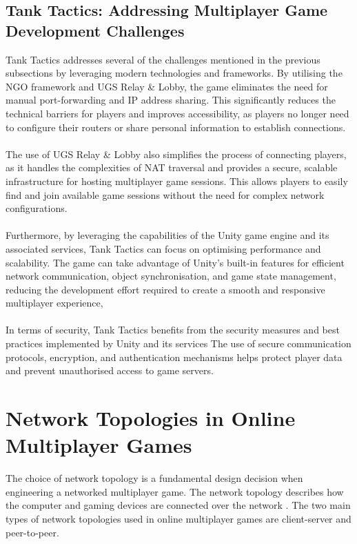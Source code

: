 \subsection{Tank Tactics: Addressing Multiplayer Game Development Challenges}
Tank Tactics addresses several of the challenges mentioned in the previous subsections by leveraging modern technologies and frameworks. By utilising the NGO framework and UGS Relay \& Lobby, the game eliminates the need for manual port-forwarding and IP address sharing. This significantly reduces the technical barriers for players and improves accessibility, as players no longer need to configure their routers or share personal information to establish connections.
\\
\noindent
\\
The use of UGS Relay \& Lobby also simplifies the process of connecting players, as it handles the complexities of NAT traversal and provides a secure, scalable infrastructure for hosting multiplayer game sessions. This allows players to easily find and join available game sessions without the need for complex network configurations.
\\
\noindent
\\
Furthermore, by leveraging the capabilities of the Unity game engine and its associated services, Tank Tactics can focus on optimising performance and scalability. The game can take advantage of Unity's built-in features for efficient network communication, object synchronisation, and game state management, reducing the development effort required to create a smooth and responsive multiplayer experience,
\\
\noindent
\\
In terms of security, Tank Tactics benefits from the security measures and best practices implemented by Unity and its services The use of secure communication protocols, encryption, and authentication mechanisms helps protect player data and prevent unauthorised access to game servers.

\section{Network Topologies in Online Multiplayer Games }
The choice of network topology is a fundamental design decision when engineering a networked multiplayer game. The network topology describes how the computer and gaming devices are connected over the network \cite{multiplayer-networking}. The two main types of network topologies used in online multiplayer games are client-server and peer-to-peer.

